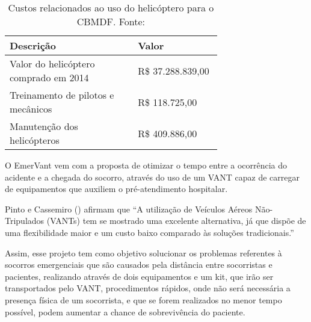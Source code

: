 \begin{table*}
\caption{Custos relacionados ao uso do helicóptero para o CBMDF. Fonte: \cite{bombeiro}}
\label{tab:custos}
\centering
  \begin{tabular}{|p{0.45\linewidth}|p{0.25\linewidth}|}
  \hline
  Descrição & Valor\\
  \hline
  Valor do helicóptero comprado em 2014 & R\$ 37.288.839,00 \\

  Treinamento de pilotos e mecânicos & R\$ 118.725,00\\
  
  Manutenção dos helicópteros & R\$ 409.886,00 \\

  \hline
  \end{tabular}
\end{table*}

O  EmerVant  vem  com a  proposta  de otimizar  o tempo  entre  a ocorrência do acidente  e a chegada  do socorro, através do uso de um VANT capaz de carregar de equipamentos que auxiliem o pré-atendimento hospitalar. 

Pinto e Cassemiro (\citeyear{pinto}) afirmam que ``A utilização de Veículos Aéreos Não-Tripulados (VANTs) tem se mostrado uma excelente alternativa, já que dispõe de uma flexibilidade maior e um custo baixo comparado às soluções tradicionais.''

Assim, esse projeto tem como objetivo solucionar os problemas referentes à socorros emergenciais que são causados pela distância entre socorristas e pacientes, realizando através de dois equipamentos e um kit, que irão ser transportados pelo VANT, procedimentos rápidos, onde não será necessária a presença física de um socorrista, e que se forem realizados no menor tempo possível, podem aumentar a chance de sobrevivência do paciente.
